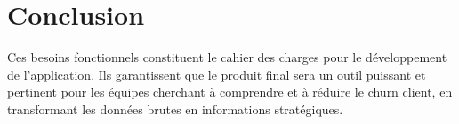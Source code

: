 \section{Conclusion}
Ces besoins fonctionnels constituent le cahier des charges pour le développement de l'application. Ils garantissent que le produit final sera un outil puissant et pertinent pour les équipes cherchant à comprendre et à réduire le churn client, en transformant les données brutes en informations stratégiques.
